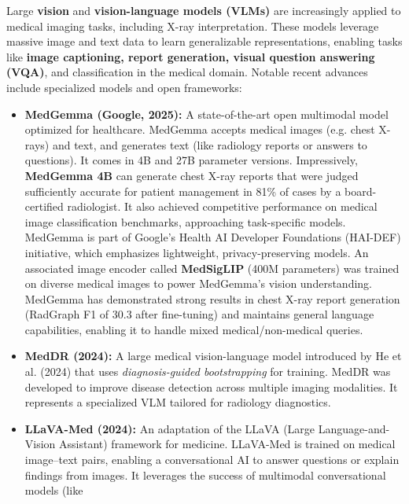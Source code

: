 \documentclass[
]{article}
\begin{document}
Large \textbf{vision} and \textbf{vision-language models (VLMs)} are
increasingly applied to medical imaging tasks, including X-ray
interpretation. These models leverage massive image and text data to
learn generalizable representations, enabling tasks like \textbf{image
captioning, report generation, visual question answering (VQA)}, and
classification in the medical
domain\cite{key-1}\cite{key-2}.
Notable recent advances include specialized models and open frameworks:

\begin{itemize}
\item
  \textbf{MedGemma (Google, 2025):} A state-of-the-art open multimodal
  model optimized for healthcare. MedGemma accepts medical images (e.g.
  chest X-rays) and text, and generates text (like radiology reports or
  answers to
  questions)\cite{key-3}.
  It comes in 4B and 27B parameter versions. Impressively,
  \textbf{MedGemma 4B} can generate chest X-ray reports that were judged
  sufficiently accurate for patient management in 81\% of cases by a
  board-certified
  radiologist\cite{key-4}.
  It also achieved competitive performance on medical image
  classification benchmarks, approaching task-specific
  models\cite{key-5}.
  MedGemma is part of Google's Health AI Developer Foundations (HAI-DEF)
  initiative, which emphasizes lightweight, privacy-preserving
  models\cite{key-6}\cite{key-7}.
  An associated image encoder called \textbf{MedSigLIP} (400M
  parameters) was trained on diverse medical images to power MedGemma's
  vision
  understanding\cite{key-8}\cite{key-9}.
  MedGemma has demonstrated strong results in chest X-ray report
  generation (RadGraph F1 of 30.3 after
  fine-tuning)\cite{key-10}
  and maintains general language capabilities, enabling it to handle
  mixed medical/non-medical queries.
\item
  \textbf{MedDR (2024):} A large medical vision-language model
  introduced by He et al. (2024) that uses \emph{diagnosis-guided
  bootstrapping} for
  training\cite{key-11}.
  MedDR was developed to improve disease detection across multiple
  imaging modalities. It represents a specialized VLM tailored for
  radiology diagnostics.
\item
  \textbf{LLaVA-Med (2024):} An adaptation of the LLaVA (Large
  Language-and-Vision Assistant) framework for
  medicine\cite{key-11}.
  LLaVA-Med is trained on medical image--text pairs, enabling a
  conversational AI to answer questions or explain findings from images.
  It leverages the success of multimodal conversational models (like

\end{itemize}
\end{document}
